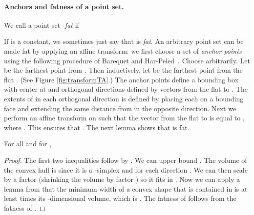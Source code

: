 \documentclass[11pt]{myclass}
\begin{document}
\paragraph{Anchors and fatness of a point set.}
We call a point set  \emph{-fat} if 

If  is a constant, we sometimes just say that  is \emph{fat}.  
An arbitrary point set  can be made fat by applying an affine 
transform: we first choose a set of  \emph{anchor points} 
 using the following procedure of 
Barequet and Har-Peled~\cite{BH01}.  Choose  arbitrarily.  
Let  be the farthest point from .  Then inductively, 
let  be the farthest point from the flat 
.  (See Figure \ref{fig:transformTA}.)
The anchor points  define a bounding box  with center at  
and orthogonal directions defined by vectors from the flat 
 to .  The extents of  in each 
orthogonal direction is defined by placing each  on a bounding 
face and extending  the same distance from  in the 
opposite direction.  
Next we perform an affine transform  on  such that the vector from the flat  to  is equal to , where  .  
This ensures that .  The next
lemma shows that  is fat.

\begin{lemma}
\label{lemma:fat}
For all  and for ,

\end{lemma}

\begin{proof}
The first two inequalities follow by .  We can upper bound .
The volume of the convex hull  is  since it is a -simplex and  for each direction .  
We can then scale  by a factor  (shrinking the volume by factor ) so it fits in .  Now we can apply a lemma from \cite{HPbook} that the minimum width of a convex shape that is contained in  is at least  times its -dimensional volume, which is .  
The fatness of  follows from the fatness of .
\end{proof}




\vspace{-.1in}
\end{document}
